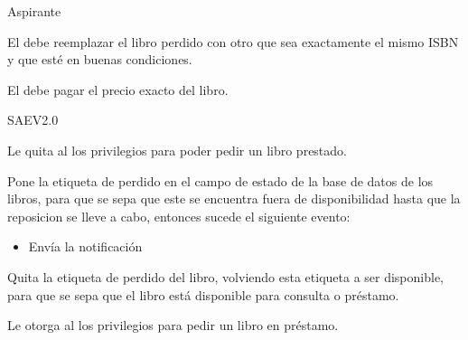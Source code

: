 \begin{PDescripcion}

  \Ppaso Aspirante

    \begin{enumerate}

      \Ppaso[\itarea]  El  debe reemplazar el libro perdido con otro que sea exactamente el mismo ISBN y que esté en buenas condiciones.

      \Ppaso[\itarea]  El  debe pagar el precio exacto del libro.


    \end{enumerate}

  \Ppaso SAEV2.0

    \begin{enumerate}

      \Ppaso[\itarea]  Le quita al  los privilegios para poder pedir un libro prestado.

      \Ppaso[\itarea]  Pone la etiqueta de perdido en el campo de estado de la base de datos de los libros, para que se sepa que este se encuentra fuera de disponibilidad hasta que la reposicion se lleve a cabo, entonces sucede el siguiente evento:
      \begin{itemize}
    \item Envía la notificación 
      \end{itemize}

      \Ppaso[\itarea]  Quita la etiqueta de perdido del libro, volviendo esta etiqueta a ser disponible, para que se sepa que el libro está disponible para consulta o préstamo.

      \Ppaso[\itarea]  Le otorga al  los privilegios para pedir un libro en préstamo.


    \end{enumerate}

\end{PDescripcion}
